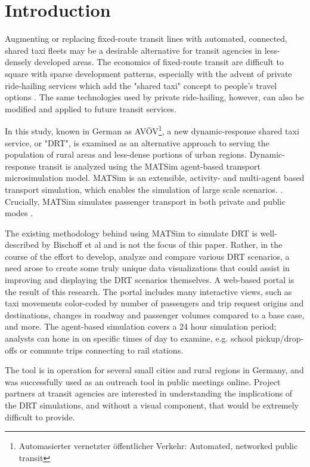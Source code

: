\documentclass[3p,times,procedia]{elsarticle}
\begin{document}

\section{Introduction}
\label{introduction}

Augmenting or replacing fixed-route transit lines with automated, connected, shared taxi fleets may be a desirable alternative for transit agencies in less-densely developed areas. The economics of fixed-route transit are difficult to square with sparse development patterns, especially with the advent of private ride-hailing services which add the "shared taxi" concept to people's travel options \cite{Hough2018}. The same technologies used by private ride-hailing, however, can also be modified and applied to future transit services.

In this study, known in German as AVÖV\footnote{Automasierter vernetzter öffentlicher Verkehr: Automated, networked public transit}, a new dynamic-response shared taxi service, or "DRT", is examined as an alternative approach to serving the population of rural areas and less-dense portions of urban regions. Dynamic-response transit is analyzed using the MATSim agent-based transport microsimulation model. MATSim is an extensible, activity- and multi-agent based transport simulation, which enables the simulation of large scale scenarios. \cite{MATSimBook}. Crucially, MATSim simulates passenger transport in both private and public modes \cite{ZiemkeEtAl2019OpenBerlinScenario}.

The existing methodology behind using MATSim to simulate DRT is well-described by Bischoff et al \cite{Bischoff2020,BischoffMaciejewskiNagel2017SharedTaxiIITSC} and is not the focus of this paper. Rather, in the course of the effort to develop, analyze and compare various DRT scenarios, a need arose to create some truly unique data visualizations that could assist in improving and displaying the DRT scenarios themselves. A web-based portal is the result of this research. The portal includes many interactive views, such as taxi movements color-coded by number of passengers and trip request origins and destinations, changes in roadway and passenger volumes compared to a base case, and more. The agent-based simulation covers a 24 hour simulation period; analysts can hone in on specific times of day to examine, e.g. school pickup/drop-offs or commute trips connecting to rail stations.

The tool is in operation for several small cities and rural regions in Germany, and was successfully used as an outreach tool in public meetings online. Project partners at transit agencies are interested in understanding the implications of the DRT simulations, and without a visual component, that would be extremely difficult to provide.
\end{document}
